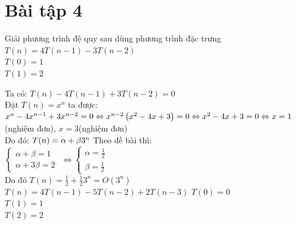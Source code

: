 \documentclass[12pt, a4paper, fleqn]{article}
\begin{document}
	
\clearpage

\section*{Bài tập 4}
Giải phương trình đệ quy sau dùng phương trình đặc trưng
$T(n) = 4T(n - 1) - 3T(n - 2)$\\
$T(0) = 1$\\
$T(1) = 2$
	
Ta có:
$T(n) - 4T(n - 1) + 3T(n - 2) = 0$\\
Đặt $T(n) = x ^ n$ ta được: \\
$x ^ n - 4x ^ {n - 1}+3x ^ {n - 2} = 0\\
\Leftrightarrow x ^ {n - 2}\left(x ^ 2 - 4x + 3\right) = 0\\
\Leftrightarrow x ^ 2 - 4x + 3 = 0\\
\Leftrightarrow x = 1$(nghiệm đơn), $x = 3$(nghiệm đơn)\\
Do đó: $T(n) = \alpha + \beta3 ^ n\\$
Theo đề bài thì:\\
$
	\begin{cases}
	\alpha + \beta = 1\\
	\alpha + 3\beta = 2
	\end{cases}
$
$\Leftrightarrow 
	\begin{cases}
	\alpha = \displaystyle \frac{1}{2}\\
	\beta = \displaystyle \frac{1}{2}
    \end{cases}
$\\
Do đó $\displaystyle T(n) = \frac{1}{2} + \frac{1}{2}3^ n = O(3 ^ n)$\\
	
$T(n) = 4T(n - 1) - 5T(n - 2) + 2T(n - 3)$
$T(0) = 0$\\
$T(1) = 1$\\
$T(2) = 2$
\end{document}
